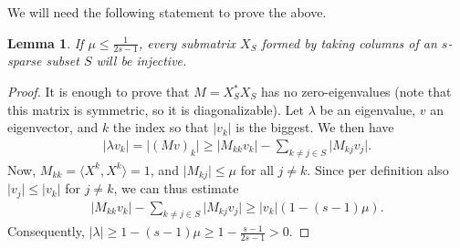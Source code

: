 \documentclass{article}
\newcommand{\sprod}[1]{\langle #1 \rangle}
\newtheorem{lemma}{Lemma}
\newcommand{\abs}[1]{\vert #1 \vert}
\begin{document}
We will need the following statement to prove the above.
\begin{lemma}
    If $\mu \leq \tfrac{1}{2s-1}$, every submatrix $X_S$ formed by taking columns of an $s$-sparse subset $S$ will be injective.
\end{lemma}
\begin{proof}
    It is enough to prove that $M=X_S^*X_S$ has no zero-eigenvalues (note that this matrix is symmetric, so it is diagonalizable). Let $\lambda$ be an eigenvalue, $v$ an eigenvector, and $k$ the index so that $\abs{v_k}$ is the biggest. We then have
    \begin{align*}
        \abs{\lambda v_k} = \abs{(Mv)_k} \geq \abs{M_{kk} v_k} - \sum_{k \neq j \in S}\abs{M_{kj}v_j}.
    \end{align*}
    Now, $M_{kk}=\sprod{X^k,X^k}=1$, and $\abs{M_{kj}}\leq \mu$ for all $j \neq k$. Since per definition also $\abs{v_j} \leq \abs{v_k}$ for $j\neq k$, we can thus estimate
    \begin{align*}
        \abs{M_{kk} v_k} - \sum_{k \neq j \in S}\abs{M_{kj}v_j} \geq \abs{v_k}(1-(s-1)\mu).
    \end{align*}
    Consequently, $\abs{\lambda} \geq 1 - (s-1)\mu \geq 1- \tfrac{s-1}{2s-1}>0$.
\end{proof}
\end{document}

